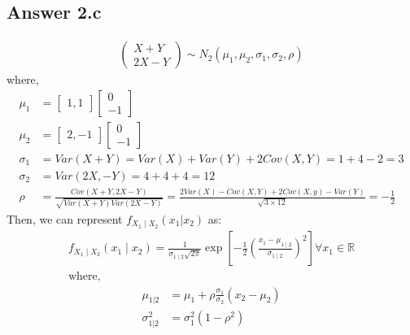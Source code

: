 \documentclass[a4paper]{article}
\begin{document}
\subsection{Answer 2.c}
\begin{equation*}
	\begin{split}
		\begin{pmatrix} X + Y\\ 2X-Y \end{pmatrix} \sim N_2\left( \mu_1, \mu_2, \sigma_1,\sigma_2,\rho  \right) 
	\end{split}
\end{equation*}
where,
\begin{equation*}
	\begin{split}
		\mu_1 &=  \begin{bmatrix} 1,1 \end{bmatrix} \begin{bmatrix} 0\\-1 \end{bmatrix}\\ 
		\mu_2 &=  \begin{bmatrix} 2,-1 \end{bmatrix} \begin{bmatrix} 0\\-1 \end{bmatrix}\\
		\sigma_1 &=  Var\left( X+Y \right) = Var\left( X \right) + Var\left( Y \right) + 2 Cov\left( X,Y \right) = 1 + 4 -2=3\\
		\sigma_2 &= Var\left( 2X,-Y \right) = 4+4+4 = 12\\
		\rho &= \frac{Cov\left( X+Y,2X-Y \right) }{\sqrt{Var\left( X+Y \right) Var\left( 2X-Y \right) } } = \frac{2Var\left( X \right) -Cov\left( X,Y \right) + 2Cov\left( X,y \right) -Var\left( Y \right) }{\sqrt{3\times 12} } = -\frac{1}{2}
	\end{split}
\end{equation*}
Then, we can represent $f_{X_1 \mid X_2}\left( x_1|x_2 \right) $ as:
\begin{equation*}
	\begin{split}
		f_{X_1 \mid X_2} \left( x_1 \mid x_2  \right)  = \frac{1}{\sigma_{1 \mid 2}\sqrt{2\pi} } \exp\left[ -\frac{1}{2}\left( \frac{x_1 - \mu_{1 \mid 2}}{\sigma_{1 \mid 2}} \right) ^2 \right] \forall x_1 \in \mathbb{R}\\
		\text{where,}
		\end{split}
\end{equation*}
\begin{equation*}
	\begin{split}
		\mu_{1|2} &=  \mu_1 + \rho\frac{\sigma_1}{\sigma_2}\left( x_2 - \mu_2 \right) \\
		\sigma_{1|2}^2 &=  \sigma_1^2\left( 1-\rho^2 \right) 
	\end{split}
\end{equation*}
\end{document}
